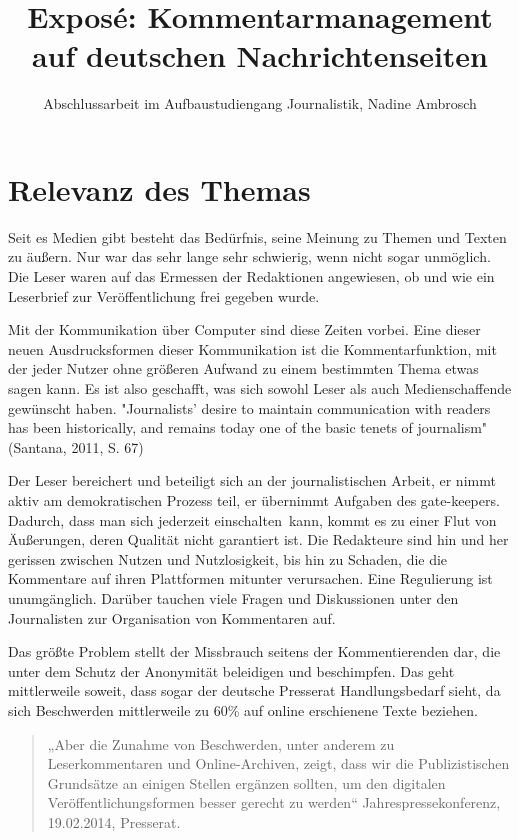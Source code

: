 \documentclass[12pt]{article} %
\title{Exposé: Kommentarmanagement auf deutschen Nachrichtenseiten}
\author{Abschlussarbeit im Aufbaustudiengang Journalistik, Nadine Ambrosch}
\begin{document}
\maketitle






\section{Relevanz des Themas}

Seit es Medien gibt besteht das Bedürfnis, seine Meinung zu Themen und Texten zu
äußern. Nur war das sehr lange sehr schwierig, wenn nicht sogar unmöglich. Die
Leser waren auf das Ermessen der Redaktionen angewiesen, ob und wie ein
Leserbrief zur Veröffentlichung frei gegeben wurde. 

Mit der Kommunikation über
Computer sind diese Zeiten vorbei. Eine dieser neuen Ausdrucksformen dieser
Kommunikation ist die Kommentarfunktion, mit der jeder Nutzer ohne größeren
Aufwand zu einem bestimmten Thema etwas sagen kann. Es ist also geschafft, was
sich sowohl Leser als auch Medienschaffende gewünscht haben. "Journalists’ desire to 
maintain communication with readers has
been historically, and remains today one of the basic tenets of journalism" (Santana, 2011, S. 67) 

Der Leser bereichert und beteiligt sich an der journalistischen Arbeit, er nimmt
aktiv am demokratischen Prozess teil, er übernimmt Aufgaben des gate-keepers.
Dadurch, dass man sich jederzeit \glqq einschalten\grqq\ kann, kommt es zu
einer Flut von Äußerungen, deren Qualität nicht garantiert ist. Die Redakteure
sind hin und her gerissen zwischen Nutzen und Nutzlosigkeit, bis hin zu Schaden,
die die Kommentare auf ihren Plattformen mitunter verursachen. Eine Regulierung
ist unumgänglich. Darüber tauchen viele Fragen und Diskussionen unter den
Journalisten zur Organisation von Kommentaren auf.

Das größte Problem stellt der Missbrauch seitens der Kommentierenden dar, die unter dem Schutz
der Anonymität beleidigen und beschimpfen. Das geht mittlerweile soweit, dass
sogar der deutsche Presserat Handlungsbedarf sieht, da sich Beschwerden
mittlerweile zu 60\% auf online erschienene Texte beziehen.  

\begin{quote}
„Aber die Zunahme
von Beschwerden, unter anderem zu Leserkommentaren und Online-Archiven, zeigt,
dass wir die Publizistischen Grundsätze an einigen Stellen ergänzen sollten, um
den digitalen Ver\-öffentlichungs\-for\-men besser gerecht zu werden“
Jahrespressekonferenz, 19.02.2014, Presserat. 
\end{quote}
\end{document}
